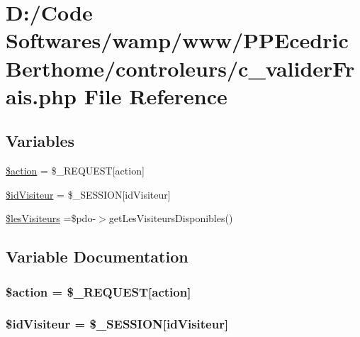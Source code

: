 \hypertarget{c__valider_frais_8php}{}\section{D\+:/\+Code Softwares/wamp/www/\+P\+P\+Ecedric\+Berthome/controleurs/c\+\_\+valider\+Frais.php File Reference}
\label{c__valider_frais_8php}
\subsection*{Variables}
\begin{DoxyCompactItemize}
\item 
\hyperlink{c__valider_frais_8php_aa698a3e72116e8e778be0e95d908ee30}{\$action} = \$\+\_\+\+R\+E\+Q\+U\+E\+ST\mbox{[}\textquotesingle{}action\textquotesingle{}\mbox{]}
\item 
\hyperlink{c__valider_frais_8php_a06480cb765d32df12f67a3589b6b9507}{\$id\+Visiteur} = \$\+\_\+\+S\+E\+S\+S\+I\+ON\mbox{[}\textquotesingle{}id\+Visiteur\textquotesingle{}\mbox{]}
\item 
\hyperlink{c__valider_frais_8php_a74f3c4d675e09d9e5d1c87b259cc749c}{\$les\+Visiteurs} =\$pdo-\/$>$get\+Les\+Visiteurs\+Disponibles()
\end{DoxyCompactItemize}


\subsection{Variable Documentation}
\subsubsection[{\texorpdfstring{\$action}{$action}}]{\setlength{\rightskip}{0pt plus 5cm}\$action = \$\+\_\+\+R\+E\+Q\+U\+E\+ST\mbox{[}\textquotesingle{}action\textquotesingle{}\mbox{]}}\hypertarget{c__valider_frais_8php_aa698a3e72116e8e778be0e95d908ee30}{}\label{c__valider_frais_8php_aa698a3e72116e8e778be0e95d908ee30}
\subsubsection[{\texorpdfstring{\$id\+Visiteur}{$idVisiteur}}]{\setlength{\rightskip}{0pt plus 5cm}\$id\+Visiteur = \$\+\_\+\+S\+E\+S\+S\+I\+ON\mbox{[}\textquotesingle{}id\+Visiteur\textquotesingle{}\mbox{]}}\hypertarget{c__valider_frais_8php_a06480cb765d32df12f67a3589b6b9507}{}\label{c__valider_frais_8php_a06480cb765d32df12f67a3589b6b9507}
